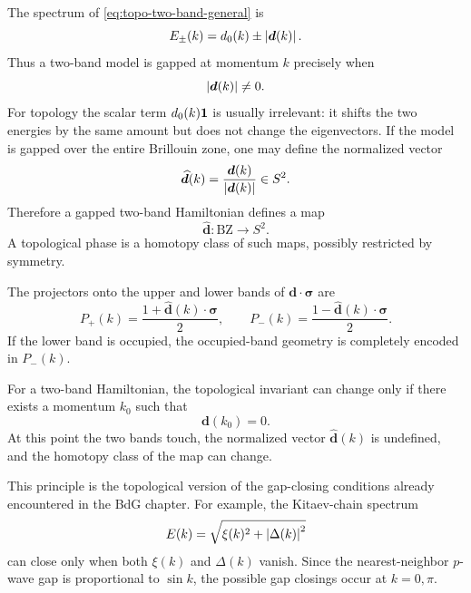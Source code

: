 The spectrum of \cref{eq:topo-two-band-general} is
\begin{equation}
\label{eq:topo-two-band-spectrum}
    E_\pm(k)=d_0(k)\pm \left|\bm d(k)\right|.
\end{equation}
Thus a two-band model is gapped at momentum $k$ precisely when
\begin{equation}
\label{eq:topo-gap-condition}
    \left|\bm d(k)\right|\neq 0.
\end{equation}
For topology the scalar term $d_0(k)\mathbf{1}$ is usually irrelevant: it shifts the two
energies by the same amount but does not change the eigenvectors.  If the model
is gapped over the entire Brillouin zone, one may define the normalized vector
\begin{equation}
\label{eq:topo-normalized-d-vector}
    \widehat{\bm d}(k)=\frac{\bm d(k)}{\left|\bm d(k)\right|}\in S^2 .
\end{equation}
Therefore a gapped two-band Hamiltonian defines a map
\begin{equation}
\label{eq:topo-map-bz-to-sphere}
    \widehat{\bm d}:\mathrm{BZ}\longrightarrow S^2.
\end{equation}
A topological phase is a homotopy class of such maps, possibly restricted by
symmetry.

The projectors onto the upper and lower bands of $\bm d\cdot\bm\sigma$ are
\begin{equation}
\label{eq:topo-band-projectors}
    P_+(k)=\frac{1+\widehat{\bm d}(k)\cdot\bm\sigma}{2},
    \qquad
    P_-(k)=\frac{1-\widehat{\bm d}(k)\cdot\bm\sigma}{2}.
\end{equation}
If the lower band is occupied, the occupied-band geometry is completely encoded
in $P_-(k)$.

\begin{principle}
For a two-band Hamiltonian, the topological invariant can change only if there
exists a momentum $k_0$ such that
\begin{equation}
    \bm d(k_0)=0.
\end{equation}
At this point the two bands touch, the normalized vector
$\widehat{\bm d}(k)$ is undefined, and the homotopy class of the map can change.
\end{principle}

This principle is the topological version of the gap-closing conditions already
encountered in the BdG chapter.  For example, the Kitaev-chain spectrum
\begin{equation}
    E(k)=\sqrt{\xi(k)^2+\left|\Delta(k)\right|^2}
\end{equation}
can close only when both $\xi(k)$ and $\Delta(k)$ vanish.  Since the nearest-neighbor
$p$-wave gap is proportional to $\sin k$, the possible gap closings occur at
$k=0,\pi$.


